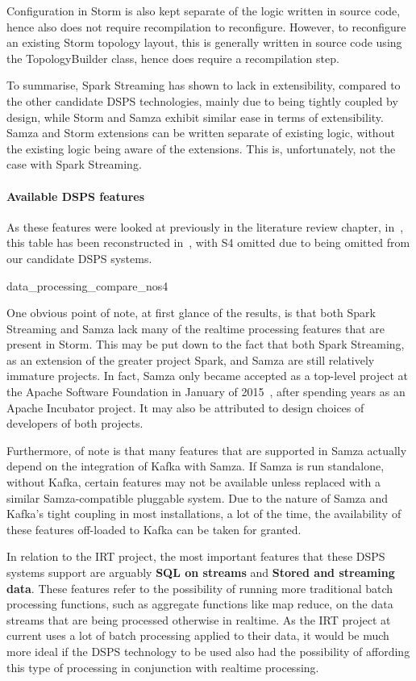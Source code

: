 Configuration in Storm is also kept separate of the logic written in source code, hence also does not require recompilation
to reconfigure. However, to reconfigure an existing Storm topology layout, this is generally written in source code using
the TopologyBuilder class, hence does require a recompilation step.

To summarise, Spark Streaming has shown to lack in extensibility, compared to the other candidate DSPS technologies, mainly
due to being tightly coupled by design, while Storm and Samza exhibit similar ease in terms of extensibility. Samza and
Storm extensions can be written separate of existing logic, without the existing logic being aware of the extensions.
This is, unfortunately, not the case with Spark Streaming.


\paragraph{Available DSPS features}

As these features were looked at previously in the literature review chapter, in~,
this table has been reconstructed in~, with S4 omitted due to being omitted from our candidate
DSPS systems.

{data_processing_compare_nos4}

One obvious point of note, at first glance of the results, is that both Spark Streaming and Samza lack many of the realtime processing
features that are present in Storm. This may be put down to the fact that both Spark Streaming, as an extension
of the greater project Spark, and Samza are still relatively immature projects. In fact, Samza only became accepted as a
top-level project at the Apache Software Foundation in January of 2015~\cite{web:apache-top-samza}, after spending years
as an Apache Incubator project. It may also be attributed to design choices of developers of both projects.

Furthermore, of note is that many features that are supported in Samza actually depend on the integration of Kafka with
Samza. If Samza is run standalone, without Kafka, certain features may not be available unless replaced with a similar
Samza-compatible pluggable system. Due to the nature of Samza and Kafka's tight coupling in most installations, a lot
of the time, the availability of these features off-loaded to Kafka can be taken for granted.

In relation to the IRT project, the most important features that these DSPS systems support are arguably \textbf{SQL on
streams} and \textbf{Stored and streaming data}. These features refer to the possibility of running more traditional
batch processing functions, such as aggregate functions like map reduce, on the data streams that are being processed
otherwise in realtime. As the IRT project at current uses a lot of batch processing applied to their data, it would be
much more ideal if the DSPS technology to be used also had the possibility of affording this type of processing in
conjunction with realtime processing.

